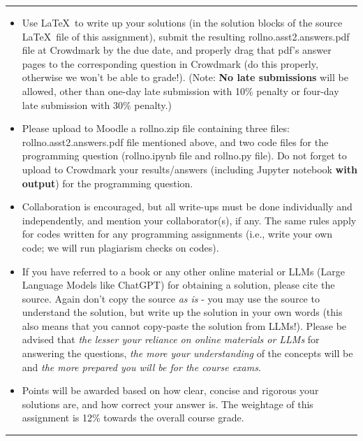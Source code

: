 \documentclass[solution,addpoints,12pt]{exam}
\begin{document}
\vspace{3mm}
\hrule
{\small
\begin{itemize}
\item Use \LaTeX\ to write up your solutions (in the solution blocks of the source \LaTeX\ file of this assignment), submit the resulting rollno.asst2.answers.pdf file at Crowdmark by the due date, and properly drag that pdf's answer pages to the corresponding question in Crowdmark (do this properly, otherwise we won't be able to grade!). (Note: {\bf No late submissions} will be allowed, other than one-day late submission with 10\% penalty or four-day late submission with 30\% penalty.)%
\item Please upload to Moodle a rollno.zip file containing three files:  rollno.asst2.answers.pdf file mentioned above, and two code files for the programming question (rollno.ipynb file and rollno.py file). Do not forget to upload to Crowdmark your results/answers (including Jupyter notebook {\bf with output}) for the programming question.
\item Collaboration is encouraged, but all write-ups must be done individually and independently, and mention your collaborator(s), if any. The same rules apply for codes written for any programming assignments (i.e., write your own code; we will run plagiarism checks on codes).
\item  If you have referred to a book or any other online material or LLMs (Large Language Models like ChatGPT) for obtaining a solution, please cite the source. Again don't copy the source {\it as is} - you may use the source to understand the solution, but write up the solution in your own words (this also means that you cannot copy-paste the solution from LLMs!). Please be advised that {\it the lesser your reliance on online materials or LLMs} for answering the questions, {\it the more your understanding} of the concepts will be and {\it the more prepared you will be for the course exams}.  
\item Points will be awarded based on how clear, concise and rigorous your solutions are, and how correct your answer is. The weightage of this assignment is 12\% towards the overall course grade. 
\end{itemize}
}
\hrule
\end{document}
